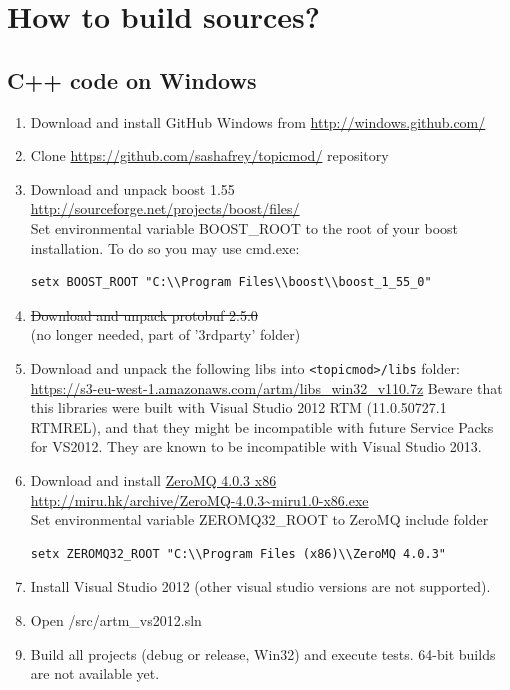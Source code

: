 \documentclass[11pt,a4paper,twoside]{report}
\begin{document}
\section{How to build sources?}
\label{label:how_to_build}

\subsection{C++ code on Windows}

\begin{enumerate}
   \item Download and install GitHub Windows from \url{http://windows.github.com/}
   \item Clone \url{https://github.com/sashafrey/topicmod/} repository
   \item Download and unpack boost 1.55  \\
         \url{http://sourceforge.net/projects/boost/files/} \\
         Set environmental variable BOOST\_ROOT to the root of your boost installation.
         To do so you may use cmd.exe:
\begin{verbatim}
setx BOOST_ROOT "C:\\Program Files\\boost\\boost_1_55_0"
\end{verbatim}
   \item \st{Download and unpack protobuf 2.5.0} \\ (no longer needed, part of '3rdparty' folder)
   \item Download and unpack the following libs into \verb'<topicmod>/libs' folder: \\
    \url{https://s3-eu-west-1.amazonaws.com/artm/libs_win32_v110.7z}
    Beware that this libraries were built with Visual Studio 2012 RTM (11.0.50727.1 RTMREL),
    and that they might be incompatible with future Service Packs for VS2012.
    They are known to be incompatible with Visual Studio 2013.
   \item Download and install \href{http://zeromq.org/distro:microsoft-windows}{ZeroMQ 4.0.3 x86} \\
         \url{http://miru.hk/archive/ZeroMQ-4.0.3~miru1.0-x86.exe} \\
         Set environmental variable ZEROMQ32\_ROOT to ZeroMQ include folder
\begin{verbatim}
setx ZEROMQ32_ROOT "C:\\Program Files (x86)\\ZeroMQ 4.0.3"
\end{verbatim}
    \item Install Visual Studio 2012 (other visual studio versions are not supported). \\
    \item Open /src/artm\_vs2012.sln
    \item Build all projects (debug or release, Win32) and execute tests. 64-bit builds are not available yet.
\end{enumerate}
\end{document}
